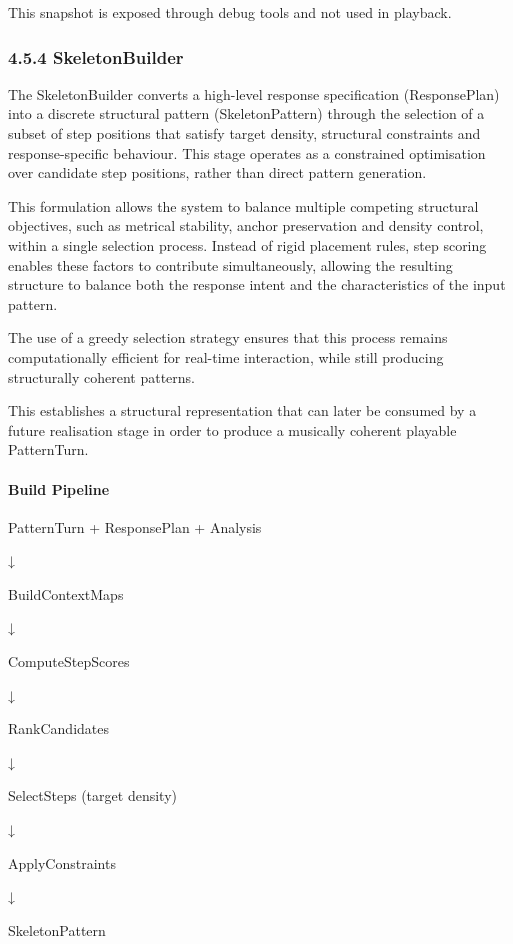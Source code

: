 This snapshot is exposed through debug tools and not used in playback.

\subsubsection{4.5.4 SkeletonBuilder}\label{skeletonbuilder}

The SkeletonBuilder converts a high-level response specification
(ResponsePlan) into a discrete structural pattern (SkeletonPattern)
through the selection of a subset of step positions that satisfy target
density, structural constraints and response-specific behaviour. This
stage operates as a constrained optimisation over candidate step
positions, rather than direct pattern generation.

This formulation allows the system to balance multiple competing
structural objectives, such as metrical stability, anchor preservation
and density control, within a single selection process. Instead of rigid
placement rules, step scoring enables these factors to contribute
simultaneously, allowing the resulting structure to balance both the
response intent and the characteristics of the input pattern.

The use of a greedy selection strategy ensures that this process remains
computationally efficient for real-time interaction, while still
producing structurally coherent patterns.

This establishes a structural representation that can later be consumed
by a future realisation stage in order to produce a musically coherent
playable PatternTurn.

\paragraph{Build Pipeline}\label{build-pipeline}

PatternTurn + ResponsePlan + Analysis

↓

BuildContextMaps

↓

ComputeStepScores

↓

RankCandidates

↓

SelectSteps (target density)

↓

ApplyConstraints

↓

SkeletonPattern

